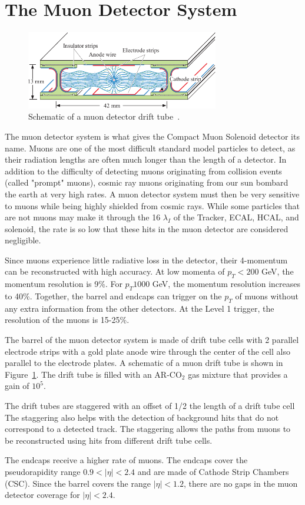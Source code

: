 \vspace{-3pt}
\section{The Muon Detector System}\label{sec:ch3:muon}

\begin{figure}[h]
\centering
\includegraphics[width=0.75\textwidth]{figures/muon_DT_schematic.png}
\caption{Schematic of a muon detector drift tube~\cite{drift_tube_image}.}
\label{fig:muon_DT_schematic}
\end{figure}


The muon detector system is what gives the Compact Muon Solenoid detector its name. Muons are one of the most difficult standard model particles to detect, as their radiation lengths are often much longer than the length of a detector. In addition to the difficulty of detecting muons originating from collision events (called "prompt" muons), cosmic ray muons originating from our sun bombard the earth at very high rates. A muon detector system must then be very sensitive to muons while being highly shielded from cosmic rays. While some particles that are not muons may make it through the 16 $\lambda_I$ of the Tracker, ECAL, HCAL, and solenoid, the rate is so low that these hits in the muon detector are considered negligible.

Since muons experience little radiative loss in the detector, their 4-momentum can be reconstructed with high accuracy. At low momenta of $p_T < 200$ GeV, the momentum resolution is 9\%. For $p_T 1000$ GeV, the momentum resolution increases to 40\%. Together, the barrel and endcaps can trigger on the $p_T$ of muons without any extra information from the other detectors. At the Level 1 trigger, the resolution of the muons is 15-25\%.

 The barrel of the muon detector system is made of drift tube cells with 2 parallel electrode strips with a gold plate anode wire through the center of the cell also parallel to the electrode plates. A schematic of a muon drift tube is shown in Figure~\ref{fig:muon_DT_schematic}. The drift tube is filled with an AR-CO$_2$ gas mixture that provides a gain of $10^5$. 
 
 The drift tubes are staggered with an offset of 1/2 the length of a drift tube cell The staggering also helps with the detection of background hits that do not correspond to a detected track. The staggering allows the paths from muons to be reconstructed using hits from different drift tube cells.

The endcaps receive a higher rate of muons. The endcaps cover the pseudorapidity range $0.9 < |\eta| < 2.4$ and are made of Cathode Strip Chambers (CSC). Since the barrel covers the range $|\eta| < 1.2$, there are no gaps in the muon detector coverage for $|\eta| < 2.4$. 


